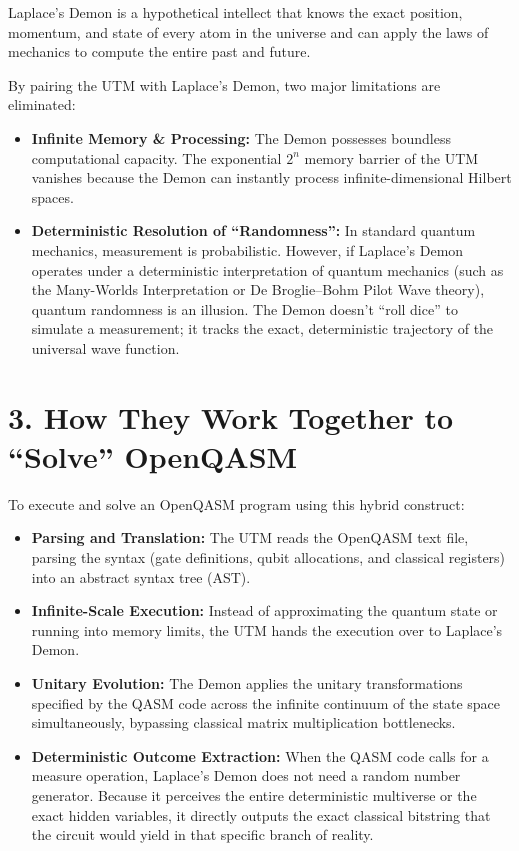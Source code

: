 Laplace's Demon is a hypothetical intellect that knows the exact position, momentum, and state of every atom in the universe and can apply the laws of mechanics to compute the entire past and future.

By pairing the UTM with Laplace's Demon, two major limitations are eliminated:

\begin{itemize}
\item \textbf{Infinite Memory \& Processing:} The Demon possesses boundless computational capacity. The exponential \(2^n\) memory barrier of the UTM vanishes because the Demon can instantly process infinite-dimensional Hilbert spaces.
\item \textbf{Deterministic Resolution of “Randomness”:} In standard quantum mechanics, measurement is probabilistic. However, if Laplace's Demon operates under a deterministic interpretation of quantum mechanics (such as the Many-Worlds Interpretation or De Broglie–Bohm Pilot Wave theory), quantum randomness is an illusion. The Demon doesn't “roll dice” to simulate a measurement; it tracks the exact, deterministic trajectory of the universal wave function.
\end{itemize}

\section{\texorpdfstring{3. How They Work Together to “Solve” OpenQASM}{3. How They Work Together to "Solve" OpenQASM}}

To execute and solve an OpenQASM program using this hybrid construct:

\begin{itemize}
\item \textbf{Parsing and Translation:} The UTM reads the OpenQASM text file, parsing the syntax (gate definitions, qubit allocations, and classical registers) into an abstract syntax tree (AST).
\item \textbf{Infinite-Scale Execution:} Instead of approximating the quantum state or running into memory limits, the UTM hands the execution over to Laplace's Demon.
\item \textbf{Unitary Evolution:} The Demon applies the unitary transformations specified by the QASM code across the infinite continuum of the state space simultaneously, bypassing classical matrix multiplication bottlenecks.
\item \textbf{Deterministic Outcome Extraction:} When the QASM code calls for a measure operation, Laplace's Demon does not need a random number generator. Because it perceives the entire deterministic multiverse or the exact hidden variables, it directly outputs the exact classical bitstring that the circuit would yield in that specific branch of reality.
\end{itemize}
